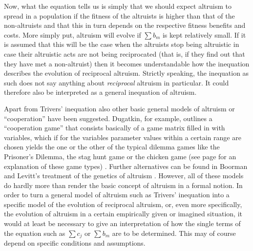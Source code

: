 Now, what the equation tells us is simply that we should expect altruism to
spread in a population if the fitness of the altruists is higher than that
of the non-altruists and that this in turn depends on the respective fitness
benefits and costs. More simply put, altruism will evolve if $\sum{} b_m$ is
kept relatively small. If it is assumed that this will be the case when the
altruists stop being altruistic in case their altruistic acts are not being
reciprocated (that is, if they find out that they have met a non-altruist)
\cite[p.\  37]{trivers:1971} then it becomes understandable how the
inequation describes the evolution of reciprocal altruism.  Strictly
speaking, the inequation as such does not say anything about {\em reciprocal}
altruism in particular. It could therefore also be interpreted as a general
inequation of altruism.

Apart from Trivers' inequation also other basic general models of altruism or
``cooperation'' have been suggested. Dugatkin, for example, outlines a
``cooperation game'' that consists basically of a game matrix filled in with
variables, which if for the variables parameter values within a certain range
are chosen yields the one or the other of the typical dilemma games like the
Prisoner's Dilemma, the stag hunt game or the chicken game (see page
\pageref{gameTypes} for an explanation of these game types) \cite[p.\ 
34ff.]{dugatkin:1997}. Further alternatives can be found in Boorman and
Levitt's treatment of the genetics of altruism \cite[]{boorman-levitt:1980}. 
However, all of these models do hardly more than render the basic concept of
altruism in a formal notion. In order to turn a general model of altruism such
as Trivers' inequation into a specific model of the evolution of reciprocal
altruism, or, even more specifically, the evolution of altruism in a certain
empirically given or imagined situation, it would at least be necessary to
give an interpretation of how the single terms of the equation such as $\sum{}
c_j$ or $\sum{} b_m$ are to be determined. This may of course depend on
specific conditions and assumptions.


